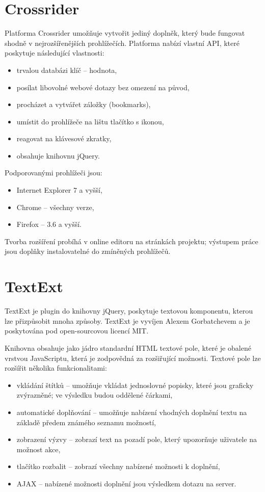 \section{Crossrider}
Platforma Crossrider umožňuje vytvořit jediný doplněk, který bude fungovat shodně v nejrozšířenějších prohlížečích.
Platforma nabízí vlastní API, které poskytuje následující vlastnosti:
\begin{itemize}
	\item trvalou databázi klíč -- hodnota,
	\item posílat libovolné webové dotazy bez omezení na původ,
	\item procházet a vytvářet záložky (bookmarks),
	\item umístit do prohlížeče na lištu tlačítko s ikonou,
	\item reagovat na klávesové zkratky,
	\item obsahuje knihovnu jQuery.
\end{itemize}

Podporovanými prohlížeči jsou:
\begin{itemize}
    \item Internet Explorer 7 a vyšší,
    \item Chrome -- všechny verze,
    \item Firefox -- 3.6 a vyšší.
\end{itemize}

Tvorba rozšíření probíhá v online editoru na stránkách projektu; výstupem práce jsou doplňky instalovatelné do zmíněných prohlížečů.

\section{TextExt}

TextExt je plugin do knihovny jQuery, poskytuje textovou komponentu, kterou lze přizpůsobit mnoha způsoby.
TextExt je vyvíjen Alexem Gorbatchevem a je poskytována pod open-sourcovou licencí MIT.

Knihovna obsahuje jako jádro standardní HTML textové pole, které je obalené vrstvou JavaScriptu, která je zodpovědná za rozšiřující možnosti.
Textové pole lze rozšířit několika funkcionalitami:
\begin{itemize}
	\item vkládání štítků -- umožňuje vkládat jednoslovné popisky, které jsou graficky zvýrazněné; ve výsledku budou oddělené čárkami,
	\item automatické doplňování -- umožňuje nabízení vhodných doplnění textu na základě předem známého seznamu možností,
	\item zobrazení výzvy -- zobrazí text na pozadí pole, který upozorňuje uživatele na možnost akce,
	\item tlačítko rozbalit -- zobrazí všechny nabízené možnosti k doplnění,
	\item AJAX -- nabízené možnosti doplnění jsou výsledkem dotazu na server.
\end{itemize}

